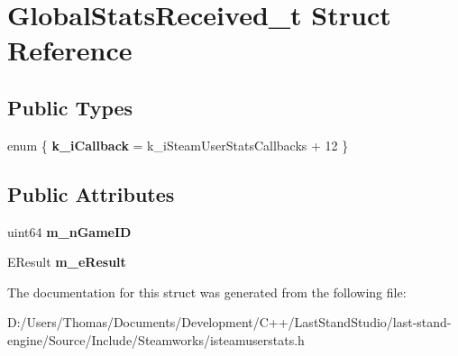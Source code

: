 \hypertarget{structGlobalStatsReceived__t}{}\section{Global\+Stats\+Received\+\_\+t Struct Reference}
\label{structGlobalStatsReceived__t}
\subsection*{Public Types}
\begin{DoxyCompactItemize}
\item 
\hypertarget{structGlobalStatsReceived__t_ac4fd08bc3277bb1dbd0f84fa07a8c7a5}{}enum \{ {\bfseries k\+\_\+i\+Callback} = k\+\_\+i\+Steam\+User\+Stats\+Callbacks + 12
 \}\label{structGlobalStatsReceived__t_ac4fd08bc3277bb1dbd0f84fa07a8c7a5}

\end{DoxyCompactItemize}
\subsection*{Public Attributes}
\begin{DoxyCompactItemize}
\item 
\hypertarget{structGlobalStatsReceived__t_a7e4e8787380b85892dd0f4b92f93ee6d}{}uint64 {\bfseries m\+\_\+n\+Game\+I\+D}\label{structGlobalStatsReceived__t_a7e4e8787380b85892dd0f4b92f93ee6d}

\item 
\hypertarget{structGlobalStatsReceived__t_aefbfd3cd7b3f0fbbcf3074da02b37d3c}{}E\+Result {\bfseries m\+\_\+e\+Result}\label{structGlobalStatsReceived__t_aefbfd3cd7b3f0fbbcf3074da02b37d3c}

\end{DoxyCompactItemize}


The documentation for this struct was generated from the following file\+:\begin{DoxyCompactItemize}
\item 
D\+:/\+Users/\+Thomas/\+Documents/\+Development/\+C++/\+Last\+Stand\+Studio/last-\/stand-\/engine/\+Source/\+Include/\+Steamworks/isteamuserstats.\+h\end{DoxyCompactItemize}
